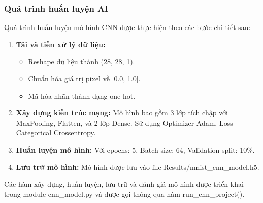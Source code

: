 \documentclass[../DoAn.tex]{subfiles}
\begin{document}
\subsubsection{Quá trình huấn luyện AI}

Quá trình huấn luyện mô hình CNN được thực hiện theo các bước chi tiết sau:

\begin{enumerate}
    \item \textbf{Tải và tiền xử lý dữ liệu:}
    \begin{itemize}
        \item Reshape dữ liệu thành (28, 28, 1).
        \item Chuẩn hóa giá trị pixel về [0.0, 1.0].
        \item Mã hóa nhãn thành dạng one-hot.
    \end{itemize}
    
    \item \textbf{Xây dựng kiến trúc mạng:} Mô hình bao gồm 3 lớp tích chập với MaxPooling, Flatten, và 2 lớp Dense. Sử dụng Optimizer Adam, Loss Categorical Crossentropy.
    
    \item \textbf{Huấn luyện mô hình:} Với epochs: 5, Batch size: 64, Validation split: 10\%.
    
    \item \textbf{Lưu trữ mô hình:} Mô hình được lưu vào file Results/mnist\_cnn\_model.h5.
    
\end{enumerate}

Các hàm xây dựng, huấn luyện, lưu trữ và đánh giá mô hình được triển khai trong module cnn\_model.py và được gọi thông qua hàm run\_cnn\_project().
\end{document}
